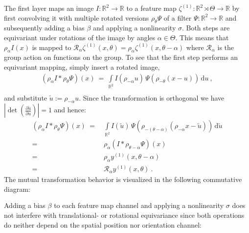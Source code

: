 \documentclass[10pt,twocolumn,letterpaper]{article}
\newcommand{\R}{\mathbb{R}}
\begin{document}
The first layer maps an image $I:\mathbb{R}^2\to\mathbb{R}$ to a feature map $\zeta^{(1)}:\mathbb{R}^2\rtimes\Theta\to\mathbb{R}$ by first convolving it with multiple rotated versions $\rho_\theta\Psi$ of a filter $\Psi:\mathbb{R}^2\to\mathbb{R}$ and subsequently adding a bias $\beta$ and applying a nonlinearity $\sigma$.
Both steps are equivariant under rotations of the image by angles $\alpha\in\Theta$.
This means that $\rho_\alpha I(x)$ is mapped to $\mathcal{R}_\alpha \zeta^{(1)}(x,\theta) = \rho_\alpha \zeta^{(1)}(x,\theta-\alpha)$ where $\mathcal{R}_\alpha$ is the group action on functions on the group.
To see that the first step performs an equivariant mapping, simply insert a rotated image,
\begin{align*}
	\left(\rho_\alpha I \ast \rho_\theta\Psi\right)(x)
	\ =\ \int\limits_{\R^2} I(\rho_{-\alpha}u)\, \Psi(\rho_{-\theta}(x-u))\, \mathrm{d}u \ , \\
\end{align*}
and substitute $\tilde{u}:=\rho_{-\alpha}u$.
Since the transformation is orthogonal we have $\left|\det\left(\frac{\partial \tilde{u}}{\partial u}\right)\right|=1$ and hence:
\begin{align*}
	\left(\rho_\alpha I \ast \rho_\theta\Psi\right)(x)
	\ =\ & \int\limits_{\R^2} I(\tilde{u})\, \Psi(\rho_{-(\theta-\alpha)}(\rho_{-\alpha}x-\tilde{u}))\, \mathrm{d}\tilde{u} \\
	=\ & \rho_\alpha \left(I \ast \rho_{\theta-\alpha}\Psi\right)(x) \\
	=\ & \rho_\alpha y^{(1)}(x,\theta-\alpha) \\
	=\ & \mathcal{R}_\alpha y^{(1)}(x,\theta)\ .
\end{align*}
The mutual transformation behavior is visualized in the following commutative diagram:
\begin{center}
\end{center}
Adding a bias $\beta$ to each feature map channel and applying a nonlinearity $\sigma$ does not interfere with translational- or rotational equivariance since both operations do neither depend on the spatial position nor orientation channel:
\end{document}
